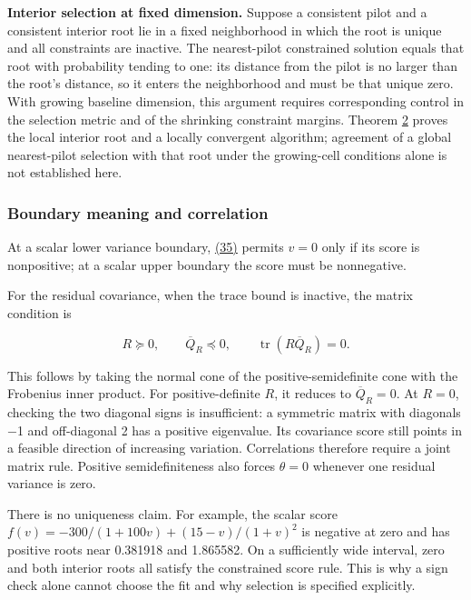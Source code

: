 \documentclass[11pt]{article}
\begin{document}
\textbf{Interior selection at fixed dimension.} Suppose a consistent pilot and a consistent interior root lie in a fixed neighborhood in which the root is unique and all constraints are inactive. The nearest-pilot constrained solution equals that root with probability tending to one: its distance from the pilot is no larger than the root's distance, so it enters the neighborhood and must be that unique zero. With growing baseline dimension, this argument requires corresponding control in the selection metric and of the shrinking constraint margins. Theorem \hyperref[res:Theorem-2]{2} proves the local interior root and a locally convergent algorithm; agreement of a global nearest-pilot selection with that root under the growing-cell conditions alone is not established here.

\subsubsection*{Boundary meaning and correlation}

At a scalar lower variance boundary, \hyperref[eq:35]{(35)} permits \(v=0\) only if its score is nonpositive; at a scalar upper boundary the score must be nonnegative.

For the residual covariance, when the trace bound is inactive, the matrix condition is

\begin{equation*}
R\succeq0,\qquad \overline Q_R\preceq0,\qquad
\operatorname{tr}(R\overline Q_R)=0.
\tag{37}\label{eq:37}
\end{equation*}

This follows by taking the normal cone of the positive-semidefinite cone with the Frobenius inner product. For positive-definite \(R\), it reduces to \(\overline Q_R=0\). At \(R=0\), checking the two diagonal signs is insufficient: a symmetric matrix with diagonals $-$1 and off-diagonal 2 has a positive eigenvalue. Its covariance score still points in a feasible direction of increasing variation. Correlations therefore require a joint matrix rule. Positive semidefiniteness also forces \(\theta=0\) whenever one residual variance is zero.

There is no uniqueness claim. For example, the scalar score
\(f(v)=-300/(1+100v)+(15-v)/(1+v)^2\) is negative at zero and has positive roots near 0.381918 and 1.865582. On a sufficiently wide interval, zero and both interior roots all satisfy the constrained score rule. This is why a sign check alone cannot choose the fit and why selection is specified explicitly.
\end{document}
